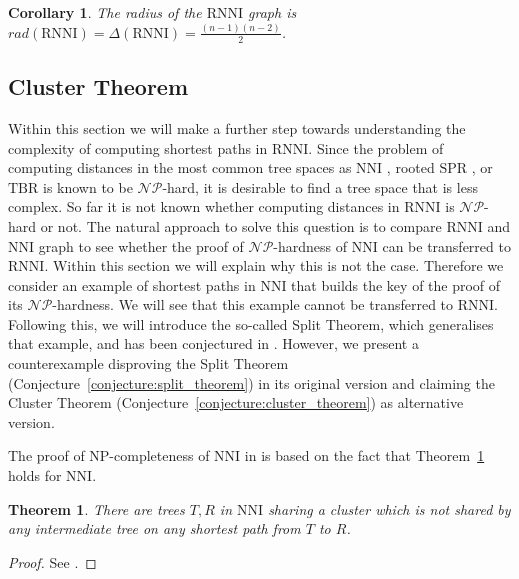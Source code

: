 \documentclass{amsart}
\newcommand{\np}{\mathcal{NP}}
\newcommand{\nni}{\mathrm{NNI}}
\newcommand{\rnni}{\mathrm{RNNI}}
\newcommand{\tbr}{\mathrm{TBR}}
\newcommand{\spr}{\mathrm{SPR}}
\newtheorem{theorem}[definition]{Theorem}
\newtheorem{corollary}[definition]{Corollary}
\begin{document}
\begin{corollary}
The radius of the $\rnni$ graph is $rad(\rnni) = \Delta(\rnni) = \frac{(n-1)(n-2)}{2}$.
\label{corollary:radius}
\end{corollary}


\subsection{Cluster Theorem}
\label{section:cluster_theorem}

Within this section we will make a further step towards understanding the complexity of computing shortest paths in $\rnni$.
Since the problem of computing distances in the most common tree spaces as $\nni$ \autocite{Dasgupta2000-xa}, rooted $\spr$ \autocite{Bordewich2005-nx}, or $\tbr$ \autocite{Allen2001-ky} is known to be $\np$-hard, it is desirable to find a tree space that is less complex.
So far it is not known whether computing distances in $\rnni$ is $\np$-hard or not.
The natural approach to solve this question is to compare $\rnni$ and $\nni$ graph to see whether the proof of $\np$-hardness of $\nni$ can be transferred to $\rnni$.
Within this section we will explain why this is not the case.
Therefore we consider an example of shortest paths in $\nni$ that builds the key of the proof of its $\np$-hardness.
We will see that this example cannot be transferred to $\rnni$.
Following this, we will introduce the so-called Split Theorem, which generalises that example, and has been conjectured in \autocite{Gavryushkin2018-ol}.
However, we present a counterexample disproving the Split Theorem (Conjecture~\ref{conjecture:split_theorem}) in its original version and claiming the Cluster Theorem (Conjecture~\ref{conjecture:cluster_theorem}) as alternative version.

The proof of NP-completeness of $\nni$ in \autocite{Dasgupta2000-xa} is based on the fact that Theorem~\ref{thm:split_nni} holds for $\nni$.

\begin{theorem}
There are trees $T,R$ in $\nni$ sharing a cluster which is not shared by any intermediate tree on any shortest path from $T$ to $R$.
\label{thm:split_nni}
\end{theorem}

\begin{proof}
See \autocite{Li1996-zw}.
\end{proof}
\end{document}
